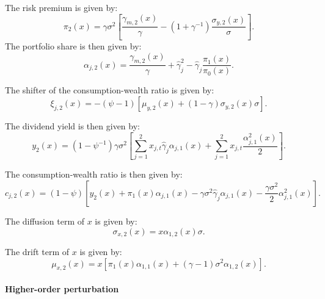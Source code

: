 \documentclass[11pt,english]{article}
\begin{document}
The risk premium is given by:
\begin{equation}
    \pi_2(x) = \gamma \sigma^2 \left[ \frac{\gamma_{m,2}(x)}{\gamma} - (1+\gamma^{-1}) \frac{\sigma_{y,2}(x)}{\sigma} \right].
\end{equation}
The portfolio share is then given by:
\begin{equation}
    \alpha_{j,2}(x) = \frac{\gamma_{m,2}(x)}{\gamma} + \hat{\gamma}_j^2  - \hat{\gamma}_j \frac{\pi_1(x)}{\pi_0(x)}.
\end{equation}

The shifter of the consumption-wealth ratio is given by:
\begin{equation}
    \xi_{j,2}(x) = -(\psi-1) \left[\mu_{y,2}(x) + (1-\gamma) \sigma_{y,2}(x) \sigma\right].
\end{equation}

The dividend yield is then given by:
\begin{equation}
    y_{2}(x) =   (1-\psi^{-1}) \gamma \sigma^2 \left[  \sum_{j=1}^2  x_{j,t} \hat{\gamma}_j \alpha_{j,1}(x) + \sum_{j=1}^2  x_{j,t}\frac{\alpha_{j,1}^2(x)}{2}  \right].
\end{equation}

The consumption-wealth ratio is then given by:
\begin{equation}
    c_{j,2}(x) = (1-\psi) \left[ y_2(x)  + \pi_1(x) \alpha_{j,1}(x) - \gamma \sigma^2 \hat{\gamma}_j \alpha_{j,1}(x)- \frac{\gamma \sigma^2}{2} \alpha_{j,1}^2(x) \right].
\end{equation}

The diffusion term of $x$ is given by:
\begin{equation}
    \sigma_{x,2}(x) = x \alpha_{1,2}(x) \sigma.
\end{equation}

The drift term of $x$ is given by:
\begin{equation}
    \mu_{x,2}(x) = x \left[ \pi_1(x) \alpha_{1,1}(x) + (\gamma-1) \sigma^2 \alpha_{1,2}(x) \right].
\end{equation}

\paragraph{Higher-order perturbation}
\end{document}
